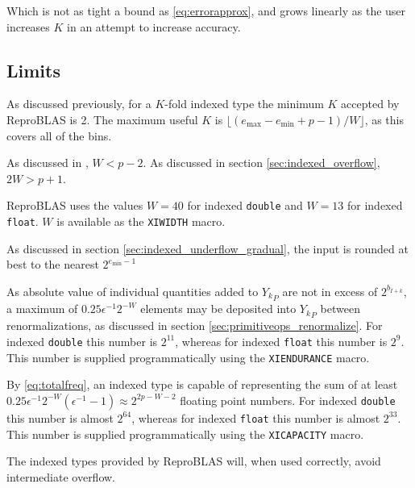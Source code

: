     Which is not as tight a bound as \eqref{eq:errorapprox}, and grows linearly
    as the user increases $K$ in an attempt to increase accuracy.

  \subsection{Limits}
    \label{sec:primitiveops_limits}
    As discussed previously, for a $K$-fold indexed type the minimum $K$
    accepted by ReproBLAS is 2. The maximum useful $K$ is
    $\lfloor(e_{\max} - e_{\min} + p - 1)/W\rfloor$,
    as this covers all of the bins.

    As discussed in \cite{repsum}, $W < p - 2$. As discussed in section
    \ref{sec:indexed_overflow}, $2 W > p + 1$.

    ReproBLAS uses the values $W = 40$ for indexed \texttt{double} and $W = 13$
    for indexed \texttt{float}. $W$ is available as the \texttt{XIWIDTH} macro.

    As discussed in section \ref{sec:indexed_underflow_gradual}, the input is
    rounded at best to the nearest $2^{e_{\min} - 1}$

    As absolute value of individual quantities added to ${Y_k}_P$ are not in
    excess of $2^{b_{I + k}}$, a maximum of $0.25\epsilon^{-1}2^{-W}$ elements
    may be deposited into ${Y_k}_P$ between renormalizations, as discussed in
    section \ref{sec:primitiveops_renormalize}. For indexed \texttt{double}
    this number is $2^{11}$, whereas for indexed \texttt{float} this number is
    $2^9$. This number is supplied programmatically using the
    \texttt{XIENDURANCE} macro.

    By \eqref{eq:totalfreq}, an indexed type is capable of representing the sum
    of at least $0.25\epsilon^{-1}2^{-W}  (\epsilon^{-1} - 1) \approx 2^{2  p - W - 2}$
    floating point numbers. For indexed \texttt{double} this number is
    almost $2^{64}$, whereas for indexed \texttt{float} this number is almost
    $2^{33}$. This number is supplied programmatically using the
    \texttt{XICAPACITY} macro.

    The indexed types provided by ReproBLAS will, when used correctly, avoid intermediate overflow.

